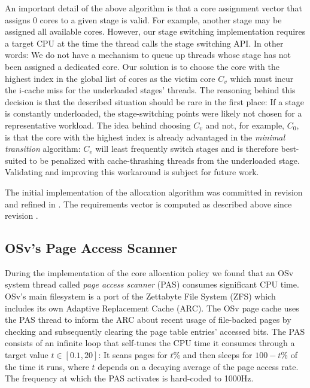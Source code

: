 \documentclass[12pt,a4paper]{book}
\begin{document}
An important detail of the above algorithm is that a core assignment vector that assigns 0 cores to a given stage is valid.
For example, another stage may be assigned all available cores.
However, our stage switching implementation requires a target CPU at the time the thread calls the stage switching API.
In other words: We do not  have a mechanism to queue up threads whose stage has not been assigned a dedicated core.
Our solution is to choose the core with the highest index in the global list of cores as the victim core $C_v$ which must incur the i-cache miss for the underloaded stages' threads.
The reasoning behind this decision is that the described situation should be rare in the first place:
If a stage is constantly underloaded, the stage-switching points were likely not chosen for a representative workload.
The idea behind choosing $C_v$ and not, for example, $C_0$, is that the core with the highest index is already advantaged in the \emph{minimal transition} algorithm:
$C_v$ will least frequently switch stages and is therefore best-suited to be penalized with cache-thrashing threads from the underloaded stage.
Validating and improving this workaround is subject for future work.

The initial implementation of the allocation algorithm was committed in revision  and refined in .
The requirements vector is computed as described above since revision .

\subsection{OSv's Page Access Scanner}
During the implementation of the core allocation policy we found that an OSv system thread called \emph{page access scanner} (PAS) consumes significant CPU time.
OSv's main filesystem is a port of the Zettabyte File System (ZFS) which includes its own Adaptive Replacement Cache (ARC).
The OSv page cache uses the PAS thread to inform the ARC about recent usage of file-backed pages by checking and subsequently clearing the page table entries' accessed bits.
The PAS consists of an infinite loop that self-tunes the CPU time it consumes through a target value $t \in [0.1, 20]$:
It scans pages for $t$\% and then sleeps for $100-t$\% of the time it runs, where $t$ depends on a decaying average of the page access rate.
The frequency at which the PAS activates is hard-coded to 1000Hz.
\end{document}

